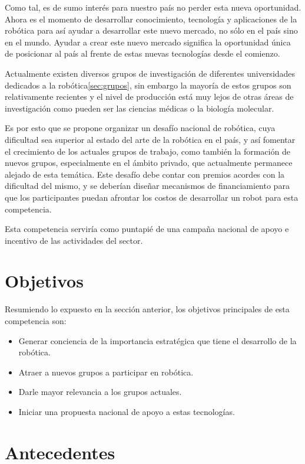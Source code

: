\documentclass[a4paper,12pt]{article}
\begin{document}
Como tal, es de sumo interés para nuestro país no perder esta nueva oportunidad. Ahora es el momento de desarrollar conocimiento, tecnología y aplicaciones de la robótica para así ayudar a desarrollar este nuevo mercado, no sólo en el país sino en el mundo. Ayudar a crear este nuevo mercado significa la oportunidad única de posicionar al país al frente de estas nuevas tecnologías desde el comienzo.
 
Actualmente existen diversos grupos de investigación de diferentes universidades dedicados a la robótica\ref{sec:grupos}, sin embargo la mayoría de estos grupos son relativamente recientes y el nivel de producción está muy lejos de otras áreas de investigación como pueden ser las ciencias médicas o la biología molecular.

Es por esto que se propone organizar un desafío nacional de robótica, cuya dificultad sea superior al estado del arte de la robótica en el país, y así fomentar el crecimiento de los actuales grupos de trabajo, como también la formación de nuevos grupos, especialmente en el ámbito privado, que actualmente permanece alejado de esta temática. Este desafío debe contar con premios acordes con la dificultad del mismo, y se deberían diseñar mecanismos de financiamiento para que los participantes puedan afrontar los costos de desarrollar un robot para esta competencia.

Esta competencia serviría como puntapié de una campaña nacional de apoyo e incentivo de las actividades del sector.

\section{Objetivos}

Resumiendo lo expuesto en la sección anterior, los objetivos principales de esta competencia son:

\begin{itemize}
 \item Generar conciencia de la importancia estratégica que tiene el desarrollo de la robótica.
 \item Atraer a nuevos grupos a participar en robótica.
 \item Darle mayor relevancia a los grupos actuales.
 \item Iniciar una propuesta nacional de apoyo a estas tecnologías.
\end{itemize}

\section{Antecedentes}
\end{document}
